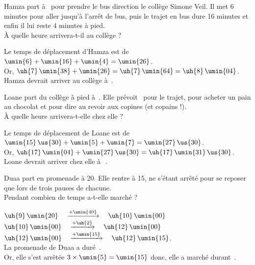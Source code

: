 \begin{colonne*exercice}
\bigskip


\begin{exercice} %
   Hamza part à \, pour prendre le bus direction le collège Simone Veil. Il met 6 minutes pour aller jusqu'à l'arrêt de bus, puis le trajet en bus dure 16 minutes et enfin il lui reste 4 minutes à pied. \\
   À quelle heure arrivera-t-il au collège ?
\end{exercice}

\begin{corrige}
   Le temps de déplacement d'Hamza est de \\
   $\umin{6}+\umin{16}+\umin{4} =\umin{26}$. \\
   Or, $\uh{7}\,\umin{38}+\umin{26} =\uh{7}\,\umin{64} =\uh{8}\,\umin{04}$. \\
   {\blue Hamza devrait arriver au collège à \,}. \\
\end{corrige}

\bigskip


\begin{exercice} %
   Loane part du collège à pied à \,. Elle prévoit \, pour le trajet,  pour acheter un pain au chocolat et  pour dire au revoir aux copines (et copains !). \\
   À quelle heure arrivera-t-elle chez elle ?
\end{exercice}

\begin{corrige}
   Le temps de déplacement de Loane est de \\
   $\umin{15}\,\us{30}+\umin{5}+\umin{7} =\umin{27}\,\us{30}$. \\
   Or, $\uh{17}\,\umin{04}+\umin{27}\,\us{30} =\uh{17}\,\umin{31}\,\us{30}$. \\
   {\blue Loane devrait arriver chez elle à \,\,}. \\
\end{corrige}

\bigskip


\begin{exercice} %
   Duaa part en promenade à  20. Elle rentre à 15, ne s'étant arrêté pour se reposer que lors de trois pauses de  chacune. \\
   Pendant combien de temps a-t-elle marché ?
\end{exercice}

\begin{corrige}
   $\uh{9}\,\umin{20} \quad \xrightarrow{+\umin{40}} \quad \uh{10}\,\umin{00}$ \\
   $\uh{10}\,\umin{00} \quad \xrightarrow{+\uh{2}} \quad \uh{12}\,\umin{00}$ \\
   $\uh{12}\,\umin{00}\quad \xrightarrow{+\umin{15}} \quad \uh{12}\,\umin{15}$. \\   
   La promenade de Duaa a duré \,. \\
   Or, elle s'est arrêtée $3\times\umin{5} =\umin{15}$ donc, {\blue elle a marché durant \,}. \\
\end{corrige}


\end{colonne*exercice}
